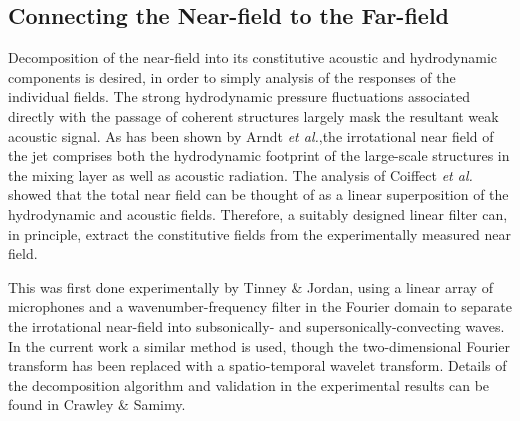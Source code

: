 \documentclass[english]{aiaa-tc}
\begin{document}
\subsection{Connecting the Near-field to the Far-field}
Decomposition of the near-field into its constitutive acoustic and hydrodynamic components is desired, in order to simply analysis of the responses of the individual fields. 
The strong hydrodynamic pressure fluctuations associated directly with the passage of coherent structures largely mask the resultant weak acoustic signal. 
As has been shown by Arndt \textit{et al.}\cite{Arndt1997},the irrotational near field of the jet comprises both the hydrodynamic footprint of the large-scale structures in the mixing layer as well as acoustic radiation. 
The analysis of Coiffect \textit{et al.}\cite{Coiffet2006} showed that the total near field can be thought of as a linear superposition of the hydrodynamic and acoustic fields. 
Therefore, a suitably designed linear filter can, in principle, extract the constitutive fields from the experimentally measured near field. 

This was first done experimentally by Tinney \& Jordan\cite{Tinney2008}, using a linear array of microphones and a wavenumber-frequency filter in the Fourier domain to separate the irrotational near-field into subsonically- and supersonically-convecting waves. 
In the current work a similar method is used, though the two-dimensional Fourier transform has been replaced with a spatio-temporal wavelet transform. 
Details of the decomposition algorithm and validation in the experimental results can be found in Crawley \& Samimy\cite{crawley2014b}.
\end{document}
